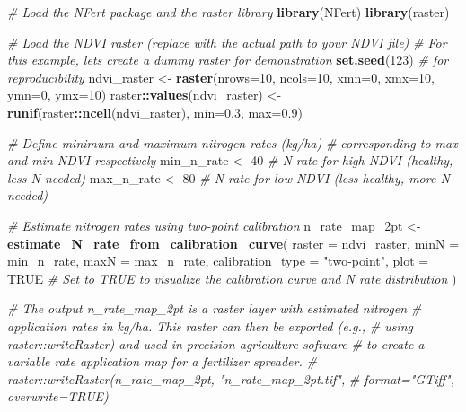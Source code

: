 \documentclass[
  11pt,
]{article}
\newenvironment{Shaded}{\begin{snugshade}}{\end{snugshade}}
\newcommand{\AttributeTok}[1]{\textcolor[rgb]{0.13,0.29,0.53}{#1}}
\newcommand{\CommentTok}[1]{\textcolor[rgb]{0.56,0.35,0.01}{\textit{#1}}}
\newcommand{\ConstantTok}[1]{\textcolor[rgb]{0.56,0.35,0.01}{#1}}
\newcommand{\DecValTok}[1]{\textcolor[rgb]{0.00,0.00,0.81}{#1}}
\newcommand{\FloatTok}[1]{\textcolor[rgb]{0.00,0.00,0.81}{#1}}
\newcommand{\FunctionTok}[1]{\textcolor[rgb]{0.13,0.29,0.53}{\textbf{#1}}}
\newcommand{\NormalTok}[1]{#1}
\newcommand{\OtherTok}[1]{\textcolor[rgb]{0.56,0.35,0.01}{#1}}
\newcommand{\SpecialCharTok}[1]{\textcolor[rgb]{0.81,0.36,0.00}{\textbf{#1}}}
\newcommand{\StringTok}[1]{\textcolor[rgb]{0.31,0.60,0.02}{#1}}
\begin{document}
\begin{Shaded}
\begin{Highlighting}[]
\CommentTok{\# Load the NFert package and the raster library}
\FunctionTok{library}\NormalTok{(NFert)}
\FunctionTok{library}\NormalTok{(raster)}

\CommentTok{\# Load the NDVI raster (replace with the actual path to your NDVI file)}
\CommentTok{\# For this example, let\textquotesingle{}s create a dummy raster for demonstration}
\FunctionTok{set.seed}\NormalTok{(}\DecValTok{123}\NormalTok{) }\CommentTok{\# for reproducibility}
\NormalTok{ndvi\_raster }\OtherTok{\textless{}{-}} \FunctionTok{raster}\NormalTok{(}\AttributeTok{nrows=}\DecValTok{10}\NormalTok{, }\AttributeTok{ncols=}\DecValTok{10}\NormalTok{, }\AttributeTok{xmn=}\DecValTok{0}\NormalTok{, }\AttributeTok{xmx=}\DecValTok{10}\NormalTok{, }\AttributeTok{ymn=}\DecValTok{0}\NormalTok{, }\AttributeTok{ymx=}\DecValTok{10}\NormalTok{)}
\NormalTok{raster}\SpecialCharTok{::}\FunctionTok{values}\NormalTok{(ndvi\_raster) }\OtherTok{\textless{}{-}} \FunctionTok{runif}\NormalTok{(raster}\SpecialCharTok{::}\FunctionTok{ncell}\NormalTok{(ndvi\_raster), }\AttributeTok{min=}\FloatTok{0.3}\NormalTok{, }\AttributeTok{max=}\FloatTok{0.9}\NormalTok{)}

\CommentTok{\# Define minimum and maximum nitrogen rates (kg/ha) }
\CommentTok{\# corresponding to max and min NDVI respectively}
\NormalTok{min\_n\_rate }\OtherTok{\textless{}{-}} \DecValTok{40} \CommentTok{\# N rate for high NDVI (healthy, less N needed)}
\NormalTok{max\_n\_rate }\OtherTok{\textless{}{-}} \DecValTok{80} \CommentTok{\# N rate for low NDVI (less healthy, more N needed)}

\CommentTok{\# Estimate nitrogen rates using two{-}point calibration}
\NormalTok{n\_rate\_map\_2pt }\OtherTok{\textless{}{-}} \FunctionTok{estimate\_N\_rate\_from\_calibration\_curve}\NormalTok{(}
  \AttributeTok{raster =}\NormalTok{ ndvi\_raster,}
  \AttributeTok{minN =}\NormalTok{ min\_n\_rate,}
  \AttributeTok{maxN =}\NormalTok{ max\_n\_rate,}
  \AttributeTok{calibration\_type =} \StringTok{"two{-}point"}\NormalTok{,}
  \AttributeTok{plot =} \ConstantTok{TRUE} \CommentTok{\# Set to TRUE to visualize the calibration curve and N rate distribution}
\NormalTok{)}

\CommentTok{\# The output \textquotesingle{}n\_rate\_map\_2pt\textquotesingle{} is a raster layer with estimated nitrogen }
\CommentTok{\# application rates in kg/ha. This raster can then be exported (e.g., }
\CommentTok{\# using raster::writeRaster) and used in precision agriculture software}
\CommentTok{\# to create a variable rate application map for a fertilizer spreader.}
\CommentTok{\# raster::writeRaster(n\_rate\_map\_2pt, "n\_rate\_map\_2pt.tif", }
\CommentTok{\#                     format="GTiff", overwrite=TRUE)}
\end{Highlighting}
\end{Shaded}
\end{document}
